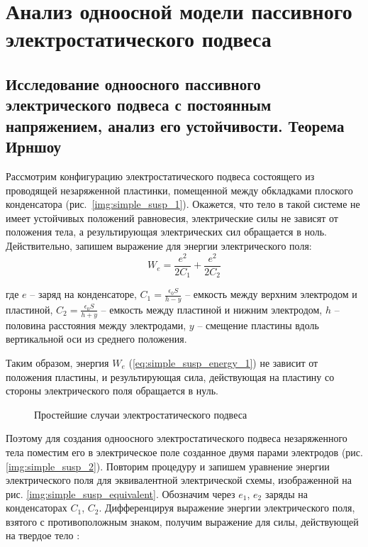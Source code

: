 \chapter{Анализ одноосной модели пассивного электростатического подвеса} \label{chapt2}

\section{Исследование одноосного пассивного электрического подвеса с постоянным напряжением, анализ его устойчивости. Теорема Ирншоу} \label{sect2_1}

Рассмотрим конфигурацию электростатического подвеса состоящего из проводящей незаряженной пластинки, помещенной между обкладками плоского конденсатора (рис.~\ref{img:simple_susp_1}). Окажется, что тело в такой системе не имеет устойчивых положений равновесия, электрические силы не зависят от положения тела, а результирующая электрических сил обращается в ноль. Действительно, запишем выражение для энергии электрического поля:
\begin{equation}
  \label{eq:simple_susp_energy_1}
  W_e = \frac{e^2}{2C_1}+\frac{e^2}{2C_2}
\end{equation}

\noindent где $e$ – заряд на конденсаторе, $C_1 = \frac{\epsilon_0 S}{h-y}$ – емкость между верхним электродом и пластиной, $C_2 = \frac{\epsilon_0 S}{h+y}$ – емкость между пластиной и нижним электродом, $h$ – половина расстояния между электродами, $y$ – смещение пластины вдоль вертикальной оси из среднего положения.

Таким образом, энергия $W_e$ (\ref{eq:simple_susp_energy_1}) не зависит от положения пластины, и результирующая сила, действующая на пластину со стороны электрического поля обращается в нуль.

\begin{figure}[ht]
    {\centering
        \hfill
        \hfill
        \hfill
    }
    \caption{Простейшие случаи электростатического подвеса}
    \label{img:simple_susp}
\end{figure}


Поэтому для создания одноосного электростатического подвеса незаряженного тела поместим его в электрическое поле созданное двумя парами электродов (рис. \ref{img:simple_susp_2}). Повторим процедуру и запишем уравнение энергии электрического поля для эквивалентной электрической схемы, изображенной на рис. \ref{img:simple_susp_equivalent}. Обозначим через $e_1$, $e_2$ заряды на конденсаторах $C_1$, $C_2$. Дифференцируя выражение энергии электрического поля, взятого с противоположным знаком, получим выражение для силы, действующей на твердое тело \cite{Martynenko}:

